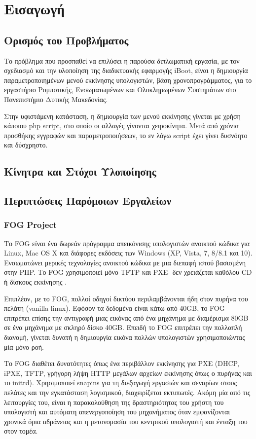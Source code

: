 \chapter{Εισαγωγή}
\section{Ορισμός του Προβλήματος}
Το πρόβλημα που προσπαθεί να επιλύσει η παρούσα διπλωματική εργασία, με τον σχεδιασμό και την υλοποίηση της διαδικτυακής εφαρμογής iBoot, είναι η δημιουργία παραμετροποιημένων μενού εκκίνησης υπολογιστών, βάση χρονοπρογράμματος, για το εργαστήριο Ρομποτικής, Ενσωματωμένων και Ολοκληρωμένων Συστημάτων στο Πανεπιστήμιο Δυτικής Μακεδονίας.

Στην υφιστάμενη κατάσταση, η δημιουργία των μενού εκκίνησης γίνεται με χρήση κάποιου php script, στο οποίο οι αλλαγές γίνονται χειροκίνητα. Μετά από χρόνια προσθήκης εγγραφών και παραμετροποιήσεων, το εν λόγω script έχει γίνει δυσνόητο και δύσχρηστο.

\section{Κίνητρα και Στόχοι Υλοποίησης}

\section{Περιπτώσεις Παρόμοιων Εργαλείων}
\subsection{FOG Project}
Το FOG είναι ένα δωρεάν πρόγραμμα απεικόνισης υπολογιστών ανοικτού κώδικα για Linux, Mac OS X και διάφορες εκδόσεις των Windows (XP, Vista, 7, 8/8.1 και 10). Ενσωματώνει μερικές τεχνολογίες ανοικτού κώδικα με μια διεπαφή ιστού βασισμένη στην PHP. Το FOG χρησιμοποιεί μόνο TFTP και PXE- δεν χρειάζεται καθόλου CD ή δίσκους εκκίνησης \cite{FOG_Project_2020}. 

Επιπλέον, με το FOG, πολλοί οδηγοί δικτύου περιλαμβάνονται ήδη στον πυρήνα του πελάτη (vanilla linux). Εφόσον τα δεδομένα είναι κάτω από 40GB, το FOG επιτρέπει επίσης την αντιγραφή μιας εικόνας από ένα μηχάνημα με διαμέρισμα 80GB σε ένα μηχάνημα με σκληρό δίσκο 40GB. Επειδή το FOG επιτρέπει την πολλαπλή διανομή, γίνεται δυνατή η δημιουργία εικόνα πολλών υπολογιστών χρησιμοποιώντας μία μόνο ροή. 

Το FOG  διαθέτει δυνατότητες  όπως ένα περιβάλλον εκκίνησης για PXE (DHCP, iPXE, TFTP, γρήγορη λήψη HTTP μεγάλων αρχείων εκκίνησης όπως ο πυρήνας και το initrd). Χρησιμοποιεί snapins για τη διεξαγωγή εργασιών και σεναρίων στους πελάτες και την εγκατάσταση λογισμικού, διαχειρίζεται εκτυπωτές. 
Ακόμη μία από τις λειτουργίες του, είναι η παρακολούθηση της δραστηριότητας του χρήστη του υπολογιστή και αυτόματη απενεργοποίηση του μηχανήματος όταν εμφανίζονται χρονικά όρια αδράνειας και η μετονομασία του κεντρικού υπολογιστή και ένταξη του στον τομέα.

